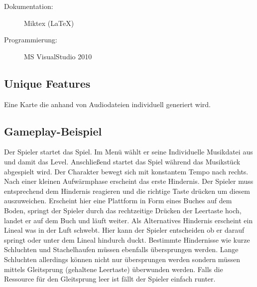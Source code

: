 \documentclass[Skript.tex]{subfiles}
\begin{document}
\begin{description}
\item[Dokumentation: ] Miktex (\LaTeX)


\item[Programmierung: ] MS VisualStudio 2010

 

\end{description}

\subsection{Unique Features}

Eine Karte die anhand von Audiodateien individuell generiert wird.


\subsection{Gameplay-Beispiel}

Der Spieler startet das Spiel.
Im Menü wählt er seine Individuelle Musikdatei aus und damit das Level. 
Anschließend startet das Spiel während das Musikstück abgespielt wird.
Der Charakter bewegt sich mit konstantem Tempo nach rechts.
Nach einer kleinen Aufwärmphase erscheint das erste Hindernis.
Der Spieler muss entsprechend dem Hindernis reagieren und die richtige Taste drücken um diesem auszuweichen.
Erscheint hier eine Plattform in Form eines Buches auf dem Boden, springt der Spieler durch das rechtzeitige Drücken der Leertaste hoch, landet er auf dem Buch und läuft weiter.
Als Alternatives Hindernis erscheint ein Lineal was in der Luft schwebt.
Hier kann der Spieler entscheiden ob er darauf springt oder unter dem Lineal hindurch duckt.
Bestimmte Hindernisse wie kurze Schluchten und Stachelhaufen müssen ebenfalls übersprungen werden.
Lange Schluchten allerdings können nicht nur übersprungen werden sondern müssen mittels Gleitsprung (gehaltene Leertaste) überwunden werden.
Falls die Ressource für den Gleitsprung leer ist fällt der Spieler einfach runter.
\end{document}
